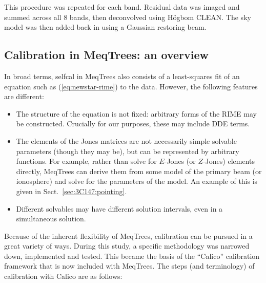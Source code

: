 \documentclass[]{aa}
\begin{document}
This procedure was repeated for each band. Residual data was imaged and summed across all 8 bands, then  deconvolved using H\"ogbom CLEAN. The sky model was then added back in using a Gaussian restoring beam.

\subsection{Calibration in MeqTrees: an overview}

In broad terms, selfcal in MeqTrees also consists of a least-squares fit of an equation such as (\ref{eq:newstar-rime}) to the data. However, the following features are different:

\begin{itemize}
\item The structure of the equation is not fixed: arbitrary forms of the RIME may be constructed. Crucially for our purposes, these may include DDE terms.
\item The elements of the Jones matrices are not necessarily simple solvable parameters (though they may be), but can be represented by arbitrary functions. For example, rather than solve for $E$-Jones (or $Z$-Jones) elements directly, MeqTrees can derive them from some model of the primary beam (or ionosphere) and solve for the parameters of the model. An example of this is given in Sect.~\ref{sec:3C147:pointing}.
\item Different solvables may have different solution intervals, even in a simultaneous solution.
\end{itemize}

Because of the inherent flexibility of MeqTrees, calibration can be pursued in a great variety of ways. During this study, a specific methodology was narrowed down, implemented and tested. This became the basis of the ``Calico'' calibration framework that is now included with MeqTrees. The steps (and terminology) of calibration with Calico are as follows:
\end{document}
